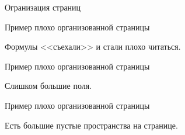 \documentclass[fleqn, xcolor=x11names]{beamer}
\begin{document}
\begin{section}{Огранизация страниц}

\begin{frame}{Пример плохо организованной страницы}
	\begin{center}
	\end{center}
	Формулы <<съехали>> и стали плохо читаться.
\end{frame}

\begin{frame}{Пример плохо организованной страницы}
	\begin{center}
	\end{center}
	Слишком большие поля.
\end{frame}

\begin{frame}{Пример плохо организованной страницы}
    \begin{center}
    \end{center}
    Есть большие пустые пространства на странице.
\end{frame}


\end{section}
\end{document}
